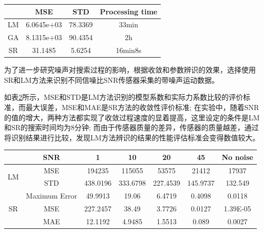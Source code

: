 \begin{table}[!t]
  \centering
  \label{tab:chap3:table1}%
  \begin{tabular}{cccc}
  \toprule
        & MSE         & STD     & Processing time  \\
  \midrule
    LM  & 6.0645e+03  & 78.3369 & 33min            \\
    GA  & 8.1315e+03  & 90.4354 & 2h               \\
    SR  & 31.1485     & 5.6254  & 16min8s          \\
  \bottomrule
  \end{tabular}%
\end{table}%


为了进一步研究噪声对搜索过程的影响，根据收敛和参数辨识的效果，选择使用SR和LM方法来识别不同信噪比SNR传感器采集的带噪声运动数据。

如表\ref{tab:chap3:table2}所示，MSE和STD是LM方法识别的模型系数和实际力系数比较的评价标准，而最大误差，MSE和MAE是SR方法的收敛性评价标准; 在实验中，随着SNR的值的增大，两种方法都实现了收敛过程速度的显着提高，这里设定的条件是LM和SR的搜索时间均为8分钟; 而由于传感器质量的差异，传感器的质量越差，通过将识别结果进行比较，发现LM方法辨识的结果的性能评估标准会变得数值较大。

\begin{table}[!t]
\centering
\label{tab:chap3:table2}
\begin{tabular}{ccccccc}
\toprule
                       & SNR   &       1   & 10       & 20       & 45       & No noise \\
\midrule
\multirow{2}{*}{LM}    & MSE   & 194235    & 115055   &53575     &21412     &17937      \\
                       & STD   & 438.0196  & 333.6798 &227.4539  &  145.9737  &  132.549  \\
\midrule
\multirow{3}{*}{SR}    & Maximum Error & 49.9913 &19.06  & 6.4719  &0.4098 & 0.0118      \\
                       & MSE           & 227.2457  &  38.49  & 3.7726 & 0.0127 & 1.39E-05 \\
                       & MAE           & 12.1192& 4.9485  &1.5513  &0.089  & 0.0027        \\
\bottomrule
\end{tabular}
\end{table}

